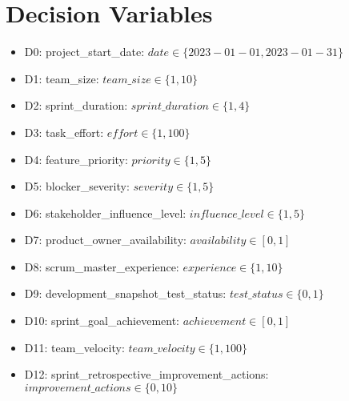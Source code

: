 \documentclass{article}
\begin{document}
\section{Decision Variables}
\begin{itemize}
    \item D0: project\_start\_date: $date \in \{2023-01-01, 2023-01-31\}$
    \item D1: team\_size: $team\_size \in \{1, 10\}$
    \item D2: sprint\_duration: $sprint\_duration \in \{1, 4\}$
    \item D3: task\_effort: $effort \in \{1, 100\}$
    \item D4: feature\_priority: $priority \in \{1, 5\}$
    \item D5: blocker\_severity: $severity \in \{1, 5\}$
    \item D6: stakeholder\_influence\_level: $influence\_level \in \{1, 5\}$
    \item D7: product\_owner\_availability: $availability \in [0, 1]$
    \item D8: scrum\_master\_experience: $experience \in \{1, 10\}$
    \item D9: development\_snapshot\_test\_status: $test\_status \in \{0, 1\}$
    \item D10: sprint\_goal\_achievement: $achievement \in [0, 1]$
    \item D11: team\_velocity: $team\_velocity \in \{1, 100\}$
    \item D12: sprint\_retrospective\_improvement\_actions: $improvement\_actions \in \{0, 10\}$
\end{itemize}
\end{document}

